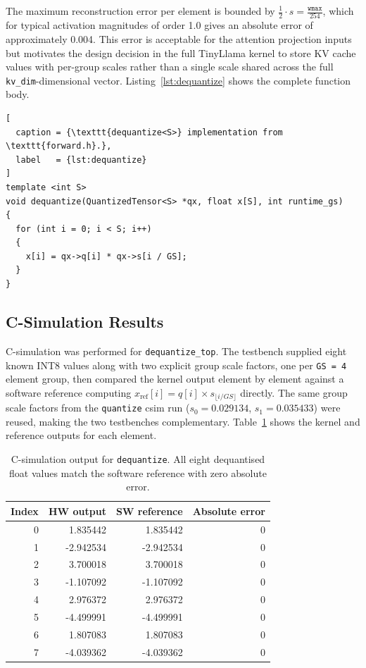 The maximum reconstruction error per element is bounded by
$\frac{1}{2} \cdot s = \frac{\texttt{wmax}}{254}$, which for typical
activation magnitudes of order 1.0 gives an absolute error of
approximately 0.004. This error is acceptable for the attention
projection inputs but motivates the design decision in the full
TinyLlama kernel to store KV cache values with per-group scales rather
than a single scale shared across the full \texttt{kv\_dim}-dimensional
vector. Listing~\ref{lst:dequantize} shows the complete function body.

\begin{lstlisting}[
  caption = {\texttt{dequantize<S>} implementation from \texttt{forward.h}.},
  label   = {lst:dequantize}
]
template <int S>
void dequantize(QuantizedTensor<S> *qx, float x[S], int runtime_gs)
{
  for (int i = 0; i < S; i++)
  {
    x[i] = qx->q[i] * qx->s[i / GS];
  }
}
\end{lstlisting}

\subsection{C-Simulation Results}
\label{subsec:dequantize_csim}

C-simulation was performed for \texttt{dequantize\_top}. The testbench
supplied eight known INT8 values along with two explicit group scale
factors, one per \texttt{GS\,=\,4} element group, then compared the
kernel output element by element against a software reference computing
$x_{\text{ref}}[i] = q[i] \times s_{\lfloor i/GS \rfloor}$ directly.
The same group scale factors from the \texttt{quantize} csim run
($s_0 = 0.029134$, $s_1 = 0.035433$) were reused, making the two
testbenches complementary. Table~\ref{tab:dequantize_csim} shows the
kernel and reference outputs for each element.

\begin{table}[H]
  \centering
  \begin{tabular}{rrrr}
    \toprule
    Index & HW output & SW reference & Absolute error \\
    \midrule
    0 &  1.835442 &  1.835442 & 0 \\
    1 & -2.942534 & -2.942534 & 0 \\
    2 &  3.700018 &  3.700018 & 0 \\
    3 & -1.107092 & -1.107092 & 0 \\
    4 &  2.976372 &  2.976372 & 0 \\
    5 & -4.499991 & -4.499991 & 0 \\
    6 &  1.807083 &  1.807083 & 0 \\
    7 & -4.039362 & -4.039362 & 0 \\
    \bottomrule
  \end{tabular}
  \caption{C-simulation output for \texttt{dequantize}.
           All eight dequantised float values match the software reference
           with zero absolute error.}
  \label{tab:dequantize_csim}

\end{table}

